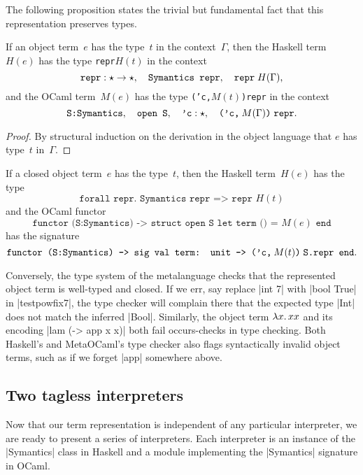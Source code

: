 The following proposition states the trivial but fundamental fact that
this representation preserves types.
\begin{proposition}\label{prop:typing}
If an object term~$e$ has the type~$t$ in the context~$\Gamma$,
then the Haskell term~$H(e)$ has the type \texttt{repr\;$H(t)$}
in the context
\[
    \texttt{repr}:\star\to\star,\quad
    \texttt{Symantics repr},\quad
    \texttt{repr}\;H(\Gamma)
    \text,
\]
and the OCaml term~$M(e)$ has the type \texttt{('c,\:$M(t)$)\;repr}
in the context
\[
    \texttt{S:Symantics},\quad
    \texttt{open S},\quad
    \texttt{'c}:\star,\quad
    \texttt{('c,\:$M(\Gamma)$)\;repr}
    \text.
\]
\end{proposition}
\begin{proof}
By structural induction on the derivation in the object language
that $e$ has type~$t$ in~$\Gamma$.
\end{proof}
\begin{corollary}\label{cor:typing}
If a closed object term~$e$ has the type~$t$,
then the Haskell term~$H(e)$ has the type
\[
    \texttt{forall repr. Symantics repr => repr $H(t)$}
\]
and the OCaml functor
\[
    \texttt{functor (S:Symantics) -> struct open S let term () = $M(e)$ end}
\]
has the signature
\[
    \texttt{functor (S:Symantics) -> sig val term: unit -> ('c,\:$M(t)$)\;S.repr end}
    \text{.}
\]
\end{corollary}

Conversely, the type system of the metalanguage checks that the
represented object term is well-typed and closed.
If we err, say replace |int 7| with |bool True| in
|testpowfix7|, the type checker will complain there that the expected type
|Int| does not match the inferred |Bool|.  Similarly, the object term
$\mathopen{\lambda\mathord{x}.\,}xx$ and its
encoding |lam (\x -> app x x)| both fail occurs-checks in type checking.
Both Haskell's and MetaOCaml's type checker also flags syntactically invalid
object terms, such as if we forget |app| somewhere above.

\subsection{Two tagless interpreters}
\label{S:interpreter-RL}

Now that our term representation is independent of any particular interpreter,
we are ready to present a series of interpreters.  Each interpreter is an
instance of the |Symantics| class in Haskell and a module implementing
the |Symantics| signature in OCaml.

